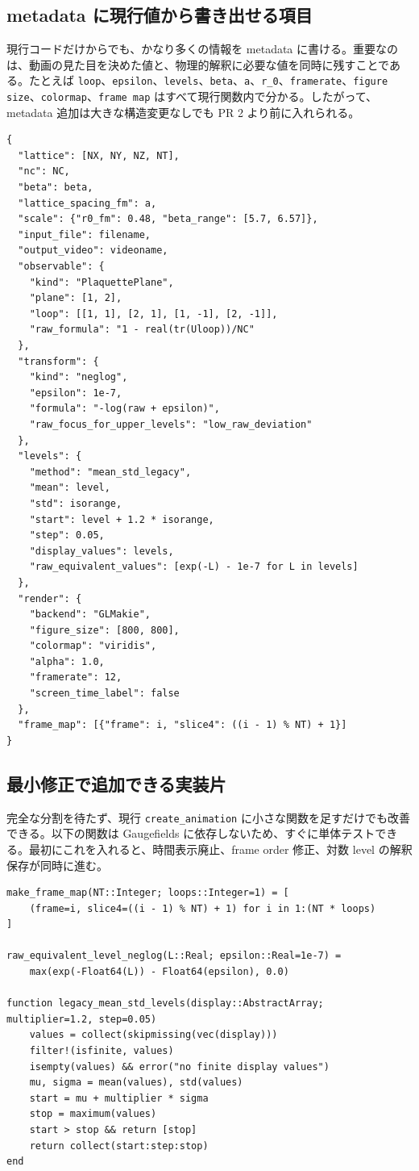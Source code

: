 \documentclass[uplatex,dvipdfmx,ja=standard,11pt,a4paper]{bxjsarticle}
\newcommand{\code}[1]{\texttt{#1}}
\begin{document}
\subsection{metadata に現行値から書き出せる項目}
現行コードだけからでも、かなり多くの情報を metadata に書ける。重要なのは、動画の見た目を決めた値と、物理的解釈に必要な値を同時に残すことである。たとえば \code{loop}、\code{epsilon}、\code{levels}、\code{beta}、\code{a}、\code{r\_0}、\code{framerate}、\code{figure size}、\code{colormap}、\code{frame map} はすべて現行関数内で分かる。したがって、metadata 追加は大きな構造変更なしでも PR 2 より前に入れられる。

\begin{lstlisting}[style=json,caption={現行 create-animation から直接書き出せる metadata 項目}]
{
  "lattice": [NX, NY, NZ, NT],
  "nc": NC,
  "beta": beta,
  "lattice_spacing_fm": a,
  "scale": {"r0_fm": 0.48, "beta_range": [5.7, 6.57]},
  "input_file": filename,
  "output_video": videoname,
  "observable": {
    "kind": "PlaquettePlane",
    "plane": [1, 2],
    "loop": [[1, 1], [2, 1], [1, -1], [2, -1]],
    "raw_formula": "1 - real(tr(Uloop))/NC"
  },
  "transform": {
    "kind": "neglog",
    "epsilon": 1e-7,
    "formula": "-log(raw + epsilon)",
    "raw_focus_for_upper_levels": "low_raw_deviation"
  },
  "levels": {
    "method": "mean_std_legacy",
    "mean": level,
    "std": isorange,
    "start": level + 1.2 * isorange,
    "step": 0.05,
    "display_values": levels,
    "raw_equivalent_values": [exp(-L) - 1e-7 for L in levels]
  },
  "render": {
    "backend": "GLMakie",
    "figure_size": [800, 800],
    "colormap": "viridis",
    "alpha": 1.0,
    "framerate": 12,
    "screen_time_label": false
  },
  "frame_map": [{"frame": i, "slice4": ((i - 1) % NT) + 1}]
}
\end{lstlisting}

\subsection{最小修正で追加できる実装片}
完全な分割を待たず、現行 \code{create\_animation} に小さな関数を足すだけでも改善できる。以下の関数は Gaugefields に依存しないため、すぐに単体テストできる。最初にこれを入れると、時間表示廃止、frame order 修正、対数 level の解釈保存が同時に進む。

\begin{lstlisting}[style=julia,caption={現行コードへ先に足せる純粋関数}]
make_frame_map(NT::Integer; loops::Integer=1) = [
    (frame=i, slice4=((i - 1) % NT) + 1) for i in 1:(NT * loops)
]

raw_equivalent_level_neglog(L::Real; epsilon::Real=1e-7) =
    max(exp(-Float64(L)) - Float64(epsilon), 0.0)

function legacy_mean_std_levels(display::AbstractArray; multiplier=1.2, step=0.05)
    values = collect(skipmissing(vec(display)))
    filter!(isfinite, values)
    isempty(values) && error("no finite display values")
    mu, sigma = mean(values), std(values)
    start = mu + multiplier * sigma
    stop = maximum(values)
    start > stop && return [stop]
    return collect(start:step:stop)
end
\end{lstlisting}
\end{document}
